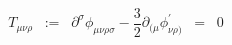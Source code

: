 \begin{equation}
T_{\mu\nu\rho} \;\; :=\;\; \partial^{\sigma} \phi_{\mu\nu\rho\sigma} - 
\frac{3}{2} \partial_{( \mu} \phi^{\prime}_{\nu\rho  )} \;\; =\;\; 0
\label{eq:c3}
\end{equation}

